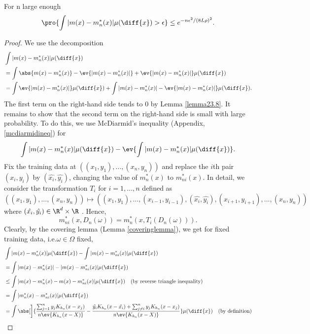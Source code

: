 \begin{lemma} \label{lemma23.9}
For n large enough \[\pro{\int |m(x) - m_n^*(x)| \mu(\diff{x}) > \epsilon} \leq e^{-n\epsilon^2/(8L\rho)^2}. \]
\end{lemma}
\begin{proof}
    We use the decomposition
    \begin{align*}
        &\int |m(x)-m_n^*(x)| \mu(\diff{x}) \\
        &= \int \abs{m(x)-m_n^*(x)} - \ev{|m(x)-m_n^*(x)|} +  \ev{|m(x)-m_n^*(x)|} \mu(\diff{x}) \\
        &= \int \ev{|m(x)-m_n^*(x)|} \mu(\diff{x}) + \int |m(x)-m_n^*(x)| - \ev{|m(x)-m_n^*(x)|} \mu(\diff{x}).
    \end{align*}
    The first term on the right-hand side tends to $0$ by Lemma \ref{lemma23.8}. It remains to show that the second term on the right-hand side is small with large probability. To do this, we use McDiarmid's inequality (Appendix, \ref{mcdiarmidineq}) for
    \[\int |m(x)-m_n^*(x)| \mu(\diff{x}) - \ev{\int |m(x)-m_n^*(x)| \mu(\diff{x})}.\]
    Fix the training data at $((x_1,y_1),...,(x_n,y_n))$ and replace the $i$th pair $(x_i,y_i)$ by $(\hat{x_i},\hat{y_i})$, changing the value of $m_n^*(x)$ to $m_{ni}^*(x)$. 
    In detail, we consider the transformation \(T_i\) for \(i = 1,...,n\) defined as
    \[((x_1, y_1),...,(x_n, y_n)) \mapsto ((x_1, y_1),...,(x_{i-1}, y_{i-1}),(\hat{x_i}, \hat{y_i}),(x_{i+1}, y_{i+1}),...,(x_n, y_n))\]
    where $(\hat{x_i}, \hat{y_i}) \in \R^d \times \R$ . Hence,
\[m_{ni}^*(x, D_n(\omega)) = m_n^*(x, T_i(D_n(\omega))).\] 
    Clearly, by the covering lemma (Lemma \ref{coveringlemma}), we get for fixed training data, i.e.\@ \(\omega \in \Omega\) fixed,
    \begin{align*}
        &\int |m(x) - m_n^*(x)| \mu(\diff{x}) - \int |m(x) - m_{ni}^*(x)| \mu(\diff{x}) \\
        &= \int |m(x) - m_n^*(x)| - |m(x) - m_{ni}^*(x)| \mu(\diff{x}) \\
        &\leq \int |m(x) - m_n^*(x) - m(x) - m_{ni}^*(x)| \mu(\diff{x}) \quad\text{(by reverse triangle inequality)}\\
        &= \int |m_n^*(x) - m_{ni}^*(x)| \mu(\diff{x}) \\
        &= \int \abs[\bigg]{\frac{\sum_{j=1}^{n} y_j K_{h_n}(x-x_j)}{n \ev{K_{h_n}(x-X)}} - \frac{\hat{y_i} K_{h_n}(x - \hat{x_i}) + \sum_{j\neq i}^{n} y_j K_{h_n}(x-x_j)}{n \ev{K_{h_n}(x-X)}}} \mu(\diff{x}) \quad\text{(by definition)} \\

\end{align*}
\end{proof}
